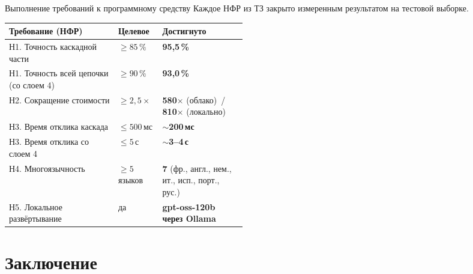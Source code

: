 \documentclass[aspectratio=169, 14pt]{beamer}
\newcommand{\pos}[1]{{\color{posgreen}#1}}
\begin{document}


\begin{frame}{Выполнение требований к программному средству}
\centering
\fontsize{8.5pt}{10.5pt}\selectfont
Каждое НФР из ТЗ закрыто измеренным
результатом на тестовой выборке.

\vspace{0.4em}
\setlength{\tabcolsep}{5pt}
\renewcommand{\arraystretch}{1.15}
\begin{tabular}{@{}p{0.46\linewidth} l l@{}}
\toprule
\textbf{Требование (НФР)} & \textbf{Целевое} & \textbf{Достигнуто} \\
\midrule
Н1. Точность каскадной части
  & $\ge 85\,\%$ & \pos{\textbf{95{,}5\,\%}} \\
Н1. Точность всей цепочки (со слоем 4)
  & $\ge 90\,\%$ & \pos{\textbf{93{,}0\,\%}} \\
Н2. Сокращение стоимости
  & $\ge 2{,}5\times$
  & \pos{\textbf{580$\times$}} (облако) \,/\, \pos{\textbf{810$\times$}} (локально) \\
Н3. Время отклика каскада
  & $\le 500$\,мс & \pos{\textbf{$\sim$200\,мс}} \\
Н3. Время отклика со слоем 4
  & $\le 5$\,с    & \pos{\textbf{$\sim$3--4\,с}} \\
Н4. Многоязычность
  & $\ge 5$ языков & \pos{\textbf{7}} (фр., англ., нем., ит., исп., порт., рус.) \\
Н5. Локальное развёртывание
  & да             & \pos{\textbf{gpt-oss-120b через Ollama}} \\
\bottomrule
\end{tabular}

\end{frame}

\section{Заключение}
\end{document}
